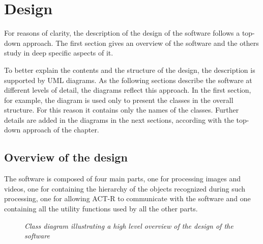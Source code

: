 \chapter{Design}
	For reasons of clarity, the description of the design of the software follows a top-down approach. The first section gives an overview of the software and the others study in deep specific aspects of it.

	To better explain the contents and the structure of the design, the description is supported by \mbox{UML} diagrams. As the following sections describe the software at different levels of detail, the diagrams reflect this approach. In the first section, for example, the diagram is used only to present the classes in the overall structure. For this reason it contains only the names of the classes. Further details are added in the diagrams in the next sections, according with the top-down approach of the chapter.

	\section{Overview of the design}
	The software is composed of four main parts, one for processing images and videos, one for containing the hierarchy of the objects recognized during such processing, one for allowing ACT-R to communicate with the software and one containing all the utility functions used by all the other parts.

	\begin{figure}[h]
	  \begin{center} 
	  \end{center} 
	  \caption{\textit{Class diagram illustrating a high level overview of the design of the software }}  
	  \label{fig:swArchitecture}
 	\end{figure}		

